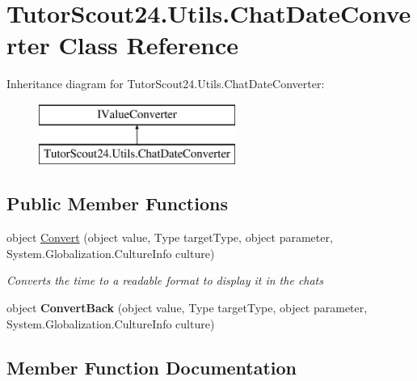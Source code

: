 \hypertarget{class_tutor_scout24_1_1_utils_1_1_chat_date_converter}{}\section{Tutor\+Scout24.\+Utils.\+Chat\+Date\+Converter Class Reference}
\label{class_tutor_scout24_1_1_utils_1_1_chat_date_converter}
Inheritance diagram for Tutor\+Scout24.\+Utils.\+Chat\+Date\+Converter\+:\begin{figure}[H]
\begin{center}
\leavevmode
\includegraphics[height=2.000000cm]{class_tutor_scout24_1_1_utils_1_1_chat_date_converter}
\end{center}
\end{figure}
\subsection*{Public Member Functions}
\begin{DoxyCompactItemize}
\item 
object \mbox{\hyperlink{class_tutor_scout24_1_1_utils_1_1_chat_date_converter_af5cf8fd1ba990def51647ea6c5e39adc}{Convert}} (object value, Type target\+Type, object parameter, System.\+Globalization.\+Culture\+Info culture)
\begin{DoxyCompactList}\small\item\em Converts the time to a readable format to display it in the chats \end{DoxyCompactList}\item 
\mbox{\label{class_tutor_scout24_1_1_utils_1_1_chat_date_converter_a28e2debd93d492d512e1f44152f8ecae}} 
object {\bfseries Convert\+Back} (object value, Type target\+Type, object parameter, System.\+Globalization.\+Culture\+Info culture)
\end{DoxyCompactItemize}


\subsection{Member Function Documentation}
\mbox{\label{class_tutor_scout24_1_1_utils_1_1_chat_date_converter_af5cf8fd1ba990def51647ea6c5e39adc}} 
